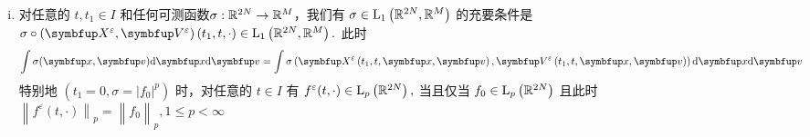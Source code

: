 \begin{lemma}
\begin{enumerate}[(i)]
    \item  %
    对任意的 $t, t_{1} \in I$ 和任何可测函数$\sigma: {\mathbb{R}}^{2N} \rightarrow {\mathbb{R}}^{M}$，我们有 $\sigma \in \mathrm{L}_{1}\left({\mathbb{R}}^{2N}, {\mathbb{R}}^{M}\right)$ 的充要条件是 $\sigma \circ (\vect{X}^{\varepsilon},\vect{V}^{\varepsilon})\left(t_{1}, t, \cdot\right) \in \mathrm{L}_{1}\left(\bbR^{2N}, \bbR^{M}\right) .$ 此时
$$\int \sigma(\vx, \vv) \mathrm{d} \vx \mathrm{d} \vv=\int \sigma\left(\vect{X}^{\varepsilon}\left(t_{1}, t, \vx, \vv\right), \vect{V}^{\varepsilon}\left(t_{1}, t, \vx, \vv\right)\right) \mathrm{d} \vx \mathrm{d} \vv$$
特别地 $\left(t_{1}=0, \sigma=|f_{0}|^{p}\right)$ 时，对任意的 $t \in I$ 有 $f^{\varepsilon}(t, \cdot) \in \mathrm{L}_{p}\left({\mathbb{R}}^{2N}\right),$ 当且仅当 $f_{0} \in \mathrm{L}_{p}\left({\mathbb{R}}^{2N}\right)$ 且此时 
$\left.\left\|\left.f^{\varepsilon}(t, \cdot)\right\|_{p}=\right\| f_{0}\right\|_{p}, 1 \leqslant p<\infty$



\end{enumerate}
\end{lemma}
